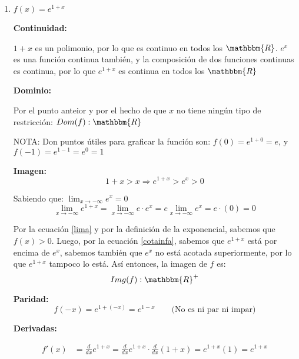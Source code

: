 \documentclass[12pt]{article}
\begin{document}
\begin{enumerate}[\hspace{9px} a)]
    \item \(f(x)=e^{1+x}\)\bigskip
    
        \textbf{Continuidad: }\medskip

            \(1+x\) es un polimonio, por lo que es continuo en todos los \(\mathbbm{R}\). $e^x$ es una funci\'on continua tambi\'en, y la composici\'on de dos funciones continuas es continua, por lo que \(e^{1+x}\) es continua en todos los \(\mathbbm{R}\)

        \textbf{Dominio: }\medskip

            Por el punto anteior y por el hecho de que $x$ no tiene ning\'un tipo de restricci\'on: \(Dom(f): \mathbbm{R}\)\medskip

            NOTA: Don puntos \'utiles para graficar la funci\'on son: \(f(0)=e^{1+0}=e\), y \(f(-1)=e^{1-1}=e^0=1\)\medskip

        \textbf{Imagen: }
            \begin{equation}
                \label{cotainfa}
                1+x>x \Longrightarrow e^{1+x}>e^x>0
            \end{equation}

            Sabiendo que: \(\lim_{x\to-\infty}e^x=0\)
            \begin{equation}
                \label{lima}
                \lim_{x\to-\infty}e^{1+x}=\lim_{x\to-\infty}e\cdot e^x=e\lim_{x\to-\infty}e^x=e\cdot(0)=0
            \end{equation}

            Por la ecuaci\'on \eqref{lima} y por la definici\'on de la exponencial, sabemos que $f(x)>0$. Luego, por la ecuaci\'on \eqref{cotainfa}, sabemos que \(e^{1+x}\) est\'a por encima de \(e^x\), sabemos tambi\'en que \(e^x\) no est\'a acotada superiormente, por lo que \(e^{1+x}\) tampoco lo est\'a. As\'i entonces, la imagen de $f$ es:
            \[Img(f): \mathbbm{R}^+\]

        \textbf{Paridad: }
            \begin{equation*}
                f(-x) = e^{1+(-x)} = e^{1-x} \qquad \text{(No es ni par ni impar)}
            \end{equation*}

        \textbf{Derivadas: }

            \begin{align*}
                f'(x) &= \frac{d}{dx}e^{1+x} = \frac{d}{dx}e^{1+x}\cdot\frac{d}{dx}(1+x) = e^{1+x}(1) = e^{1+x}
            \end{align*}


\end{enumerate}
\end{document}
